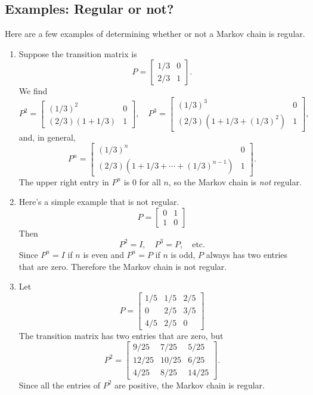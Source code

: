 \documentclass[reqno]{immbook}
\numberwithin{equation}{chapter}
\numberwithin{question}{section}
\numberwithin{theorem}{chapter}
\numberwithin{figure}{chapter}
\theoremstyle{definition}
\begin{document}
\subsection*{Examples: Regular or not?}
Here are a few examples of determining whether or not a
Markov chain is regular.
\begin{enumerate}
\item Suppose the transition matrix is
\begin{equation}
  P = \begin{bmatrix} 1/3 & 0 \\ 2/3 & 1 \end{bmatrix}.
\end{equation}
We find
\begin{equation}
 P^2 = \begin{bmatrix} (1/3)^2 & 0 \\ (2/3)(1+1/3) & 1 \end{bmatrix},
 \quad
 P^3 = \begin{bmatrix} (1/3)^3 & 0 \\ (2/3)(1+1/3+(1/3)^2) & 1 \end{bmatrix},
\end{equation}
and, in general,
\begin{equation}
 P^n = \begin{bmatrix} (1/3)^n & 0 \\ (2/3)(1+1/3+\cdots+(1/3)^{n-1}) & 1 \end{bmatrix}.
\end{equation}
The upper right entry in $P^n$ is $0$ for all $n$, so the Markov chain
is \emph{not} regular.
\item Here's a simple example that is not regular.
\begin{equation}
   P = \begin{bmatrix} 0 & 1 \\ 1 & 0 \end{bmatrix}
\end{equation}
Then
\begin{equation}
   P^2 = I, \quad P^3 = P, \quad \textrm{etc.}
\end{equation}
Since $P^n=I$ if $n$ is even and $P^n=P$ if $n$ is odd, $P$
always has two entries that are zero.  Therefore the Markov
chain is not regular.
\item
Let
\begin{equation}
  P = \begin{bmatrix}
           1/5 & 1/5 & 2/5 \\
	   0   & 2/5 & 3/5 \\
	   4/5 & 2/5 & 0
      \end{bmatrix}
\end{equation}
The transition matrix has two entries that are zero, but
\begin{equation}
  P^2 = \begin{bmatrix}
           9/25 & 7/25 & 5/25 \\
	   12/25 & 10/25 & 6/25 \\
	   4/25 & 8/25 & 14/25
        \end{bmatrix}.
\end{equation}
Since all the entries of $P^2$ are positive, the Markov chain
is regular.
\end{enumerate}
%
%
%
\end{document}
